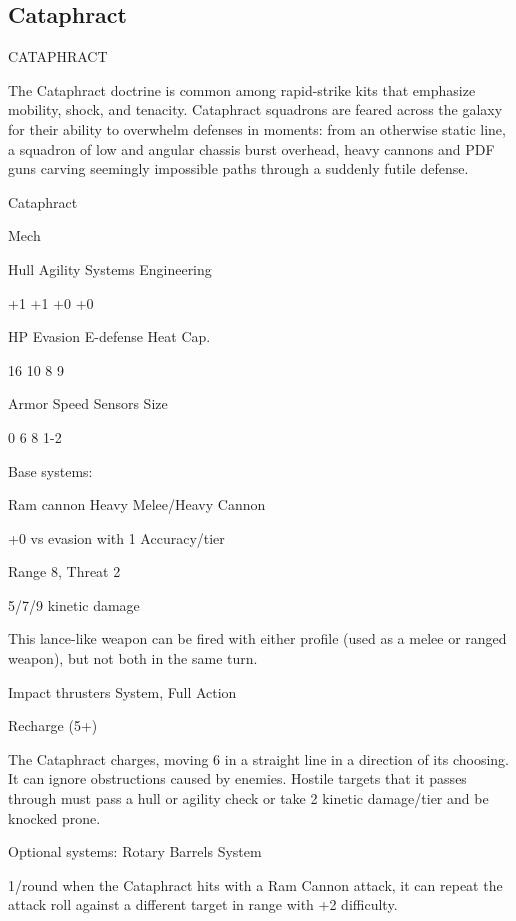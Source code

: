 \subsection{Cataphract}
                                            CATAPHRACT

The Cataphract doctrine is common among rapid-strike kits that emphasize mobility, shock, and
tenacity. Cataphract squadrons are feared across the galaxy for their ability to overwhelm
defenses in moments: from an otherwise static line, a squadron of low and angular chassis burst
overhead, heavy cannons and PDF guns carving seemingly impossible paths through a suddenly
futile defense.


 Cataphract

 Mech

 Hull       Agility      Systems       Engineering

 +1         +1           +0            +0

 HP         Evasion      E-defense     Heat Cap.

 16         10           8             9

 Armor      Speed        Sensors       Size

 0          6            8             1-2

Base systems:

Ram cannon
Heavy Melee/Heavy Cannon

+0 vs evasion with 1 Accuracy/tier

Range 8, Threat 2

5/7/9 kinetic damage

This lance-like weapon can be fired with either profile (used as a melee or ranged weapon), but
not both in the same turn.


Impact thrusters
System, Full Action

Recharge (5+)

The Cataphract charges, moving 6 in a straight line in a direction of its choosing. It can ignore
obstructions caused by enemies. Hostile targets that it passes through must pass a hull or agility
check or take 2 kinetic damage/tier and be knocked prone.


Optional systems:
Rotary Barrels
System

1/round when the Cataphract hits with a Ram Cannon attack, it can repeat the attack roll against
a different target in range with +2 difficulty.





